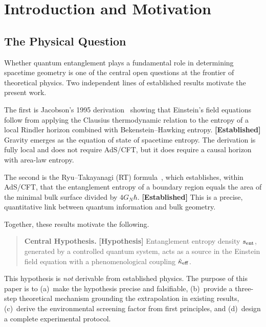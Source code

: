 \documentclass[12pt,letterpaper]{article}
\theoremstyle{definition}
\theoremstyle{remark}
\newcommand{\established}{\textbf{[Established]}}
\newcommand{\hypothesis}{\textbf{[Hypothesis]}}
\newcommand{\keff}{\tilde{\kappa}_{\rm eff}}
\newcommand{\sent}{s_{\rm ent}}
\newcommand{\hb}{\hbar}
\begin{document}
\newpage
\tableofcontents
\newpage

\section{Introduction and Motivation}

\subsection{The Physical Question}

Whether quantum entanglement plays a fundamental role in determining spacetime geometry
is one of the central open questions at the frontier of theoretical physics.
Two independent lines of established results motivate the present work.

The first is Jacobson's 1995 derivation~\cite{jacobson1995} showing that Einstein's
field equations follow from applying the Clausius thermodynamic relation to the entropy
of a local Rindler horizon combined with Bekenstein--Hawking entropy.
\established{} Gravity emerges as the equation of state of spacetime entropy.
The derivation is fully local and does not require AdS/CFT, but it does require a causal
horizon with area-law entropy.

The second is the Ryu--Takayanagi (RT) formula~\cite{ryu2006}, which establishes,
within AdS/CFT, that the entanglement entropy of a boundary region equals the area of
the minimal bulk surface divided by $4G_N\hb$.
\established{} This is a precise, quantitative link between quantum information and bulk
geometry.

Together, these results motivate the following.

\begin{quote}
\textbf{Central Hypothesis.} \hypothesis{} Entanglement entropy density $\sent$,
generated by a controlled quantum system, acts as a source in the Einstein field equation
with a phenomenological coupling $\keff$.
\end{quote}

This hypothesis is \emph{not} derivable from established physics.
The purpose of this paper is to (a)~make the hypothesis precise and falsifiable,
(b)~provide a three-step theoretical mechanism grounding the extrapolation in existing
results, (c)~derive the environmental screening factor from first principles, and
(d)~design a complete experimental protocol.
\end{document}
